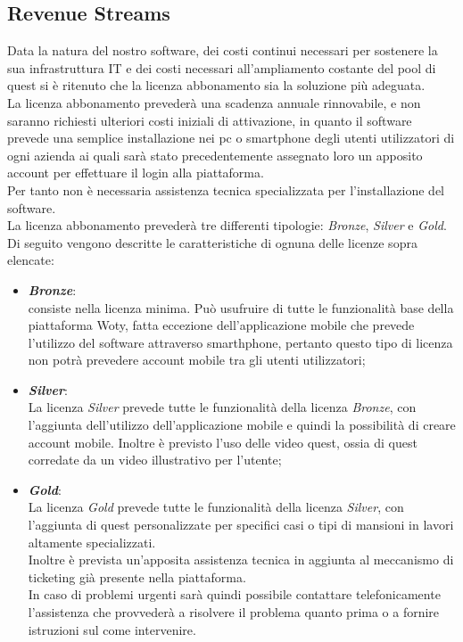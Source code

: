 \subsection{Revenue Streams}
Data la natura del nostro software, dei costi continui necessari per sostenere la sua infrastruttura IT e dei costi necessari all'ampliamento costante del pool di quest si è ritenuto che la licenza abbonamento sia la soluzione più adeguata.\\
La licenza abbonamento prevederà una scadenza annuale rinnovabile, e non saranno richiesti ulteriori costi iniziali di attivazione, in quanto il software prevede una semplice installazione nei pc o smartphone degli utenti utilizzatori di ogni azienda ai quali sarà stato precedentemente assegnato loro un apposito account per effettuare il login alla piattaforma.\\
Per tanto non è necessaria assistenza tecnica specializzata per l'installazione del software.\\
La licenza abbonamento prevederà tre differenti tipologie: \textit{Bronze}, \textit{Silver} e \textit{Gold}.
Di seguito vengono descritte le caratteristiche di ognuna delle licenze sopra elencate:

\begin{itemize}
\item \textbf{\textit{Bronze}}:\\
consiste nella licenza minima.
Può usufruire di tutte le funzionalità base della piattaforma Woty, fatta eccezione dell'applicazione mobile che prevede l'utilizzo del software attraverso smarthphone, pertanto questo tipo di licenza non potrà prevedere account mobile tra gli utenti utilizzatori;


\item \textbf{\textit{Silver}}:\\
La licenza \textit{Silver} prevede tutte le funzionalità della licenza \textit{Bronze}, con l'aggiunta dell'utilizzo dell'applicazione mobile e quindi la possibilità di creare account mobile.
Inoltre è previsto l'uso delle video quest, ossia di quest corredate da un video illustrativo per l'utente;


\item \textbf{\textit{Gold}}:\\
La licenza \textit{Gold} prevede tutte le funzionalità della licenza \textit{Silver}, con l'aggiunta di quest personalizzate per specifici casi o tipi di mansioni in lavori altamente specializzati.\\
Inoltre è prevista un'apposita assistenza tecnica in aggiunta al meccanismo di ticketing già presente nella piattaforma.\\
In caso di problemi urgenti sarà quindi possibile contattare telefonicamente l'assistenza che provvederà a risolvere il problema quanto prima o a fornire istruzioni sul come intervenire.\\

\end{itemize}

